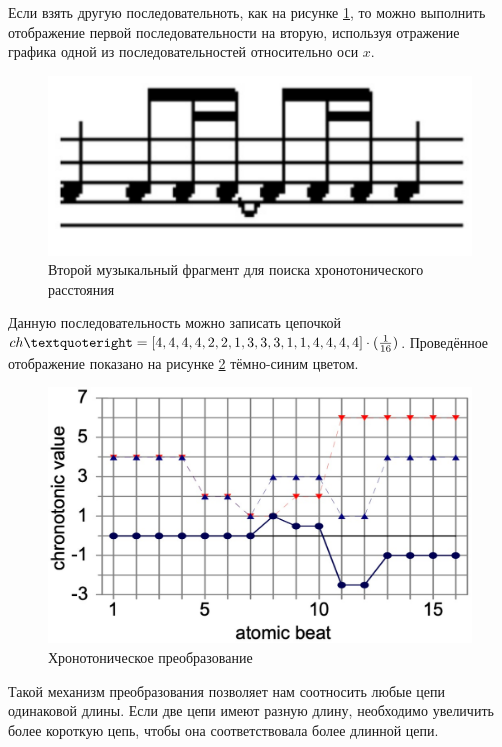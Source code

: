 Если взять другую последовательноть, как на рисунке \ref{img:chr3}, то можно выполнить отображение первой последовательности на вторую, используя отражение графика одной из последовательностей относительно оси $x$.

\begin{figure}[h!]
    \centering
    \includegraphics[scale=0.5]{img/chr3.pdf}
    \caption{Второй музыкальный фрагмент для поиска хронотонического расстояния \cite{bib13}}
    \label{img:chr3}
\end{figure}

Данную последовательность можно записать цепочкой $ch’ = [4, 4, 4, 4, 2, 2,\\ 1, 3, 3, 3, 1, 1, 4, 4, 4, 4] \cdot (\frac{1}{16})$. Проведённое отображение показано на рисунке \ref{img:chr4} тёмно-синим цветом. 

\begin{figure}[h!]
    \centering
    \includegraphics[scale=0.5]{img/chr4.pdf}
    \caption{Хронотоническое преобразование \cite{bib13}}
    \label{img:chr4}
\end{figure}

Такой механизм преобразования позволяет нам соотносить любые цепи одинаковой длины. Если две цепи имеют разную длину, необходимо увеличить более короткую цепь, чтобы она соответствовала более длинной цепи. 

